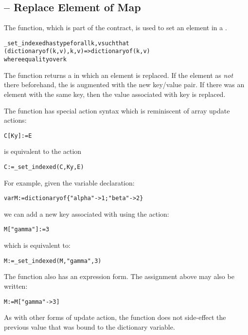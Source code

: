 \subsection{ -- Replace Element of Map}
\label{mapReplaceFunction}
The  function, which is part of the  contract, is used to set an element in a .
\begin{alltt}
\_set\_indexed has type for all k,v such that
                        (dictionary of (k,v),k,v)=>dictionary of (k,v)
                        where equality over k
\end{alltt}
The  function returns a  in which an element is replaced. If the element as \emph{not} there beforehand, the  is augmented with the new key/value pair. If there was an element with the same key, then the value associated with key is replaced.

The  function has special action syntax which is reminiscent of array update actions:
\begin{alltt}
C[Ky] := E
\end{alltt}
is equivalent to the action
\begin{alltt}
C := \_set\_indexed(C,Ky,E)
\end{alltt}
For example, given the variable declaration:
\begin{alltt}
var M := dictionary of \{ "alpha"->1; "beta"->2 \}
\end{alltt}
we can add a new key associated with  using the action:
\begin{alltt}
M["gamma"] := 3
\end{alltt}
which is equivalent to:
\begin{alltt}
M := _set_indexed(M,"gamma",3)
\end{alltt}
The  function also has an expression form. The assignment above may also be written:
\begin{alltt}
M := M["gamma"->3]
\end{alltt}

\begin{aside}
As with other forms of update action, the  function does not side-effect the previous value that was bound to the dictionary variable.
\end{aside}

